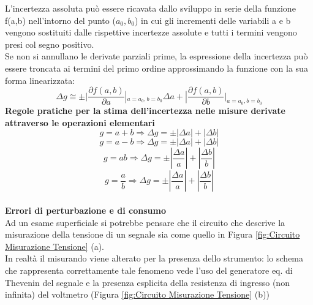 \documentclass{article}
\begin{document}
L'incertezza assoluta può essere ricavata dallo sviluppo in serie della funzione f(a,b) 
nell’intorno del punto ($a_{0}, b_{0}$) in cui gli incrementi delle variabili a e b vengono sostituiti 
dalle rispettive incertezze assolute e tutti i termini vengono presi col segno positivo.\\ Se 
non si annullano le derivate parziali prime, la espressione della incertezza può essere 
troncata ai termini del primo ordine approssimando la funzione con la sua forma 
linearizzata:
\begin{equation}
    \Delta g \cong \pm \vert \frac{\partial f(a,b)}{\partial a}|_{a=a_{0},b=b_{0}} \Delta a+|\frac{\partial f(a,b)}{\partial b}|_{a=a_{0},b=b_{0}}
\end{equation}
\textbf{Regole pratiche per la stima dell’incertezza nelle misure derivate attraverso le operazioni elementari}
\begin{equation}
    g=a+b \Rightarrow \Delta g = \pm |\Delta a|+|\Delta b|
\end{equation}
\begin{equation}
    g=a-b \Rightarrow \Delta g = \pm |\Delta a|+|\Delta b|
\end{equation}
\begin{equation}
    g=ab \Rightarrow \Delta g = \pm |\frac{\Delta a}{a}|+|\frac{\Delta b}{b}|
\end{equation}
\begin{equation}
    g=\frac{a}{b} \Rightarrow \Delta g = \pm |\frac{\Delta a}{a}|+|\frac{\Delta b}{b}|
\end{equation}\\
\textbf{Errori di perturbazione e di consumo }\\
Ad un esame superficiale si potrebbe pensare che il circuito che descrive la misurazione della 
tensione di un segnale sia come quello in Figura \ref{fig:Circuito Misurazione Tensione} (a).\\
In realtà il misurando viene alterato per la presenza dello strumento: lo schema che rappresenta 
correttamente tale fenomeno vede l'uso del generatore eq. di Thevenin del segnale e la presenza esplicita della resistenza di ingresso (non infinita) del voltmetro (Figura \ref{fig:Circuito Misurazione Tensione} (b))\\
\end{document}
